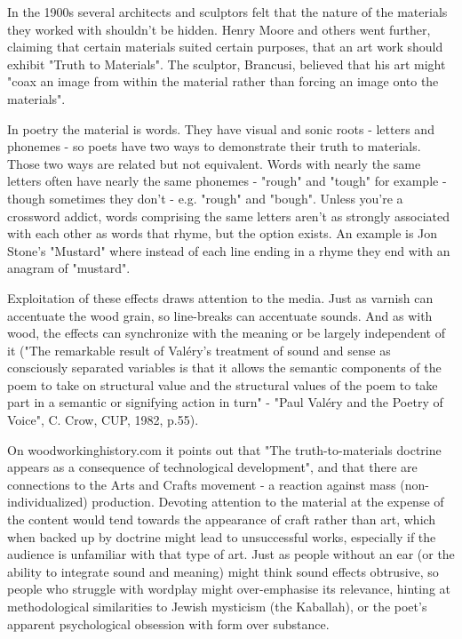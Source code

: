 \documentclass[11pt]{article}
\begin{document}
In the 1900s several architects and sculptors felt that the nature of the materials they worked with shouldn't be hidden. Henry Moore and others went further, claiming that certain materials suited certain purposes, that an art work should exhibit "Truth to Materials". The sculptor, Brancusi, believed that his art might "coax an image from within the material rather than forcing an image onto the materials".

In poetry the material is words. They have visual and sonic roots - letters and phonemes - so poets have two ways to demonstrate their truth to materials. Those two ways are related but not equivalent. Words with nearly the same letters often have nearly the same phonemes - "rough" and "tough" for example - though sometimes they don't - e.g. "rough" and "bough". Unless you're a crossword addict, words comprising the same letters aren't as strongly associated with each other as words that rhyme, but the option exists. An example is Jon Stone's "Mustard" where instead of each line ending in a rhyme they end with an anagram of "mustard".

Exploitation of these effects draws attention to the media. Just as varnish can accentuate the wood grain, so line-breaks can accentuate sounds. And as with wood, the effects can synchronize with the meaning or be largely independent of it ("The remarkable result of Valéry's treatment of sound and sense as consciously separated variables is that it allows the semantic components of the poem to take on structural value and the structural values of the poem to take part in a semantic or signifying action in turn" - "Paul Valéry and the Poetry of Voice", C. Crow, CUP, 1982, p.55).

On woodworkinghistory.com it points out that "The truth-to-materials doctrine appears as a consequence of technological development", and that there are connections to the Arts and Crafts movement - a reaction against mass (non-individualized) production. Devoting attention to the material at the expense of the content would tend towards the appearance of craft rather than art, which when backed up by doctrine might lead to unsuccessful works, especially if the audience is unfamiliar with that type of art. Just as people without an ear (or the ability to integrate sound and meaning) might think sound effects obtrusive, so people who struggle with wordplay might over-emphasise its relevance, hinting at methodological similarities to Jewish mysticism (the Kaballah), or the poet's apparent psychological obsession with form over substance.
\end{document}
